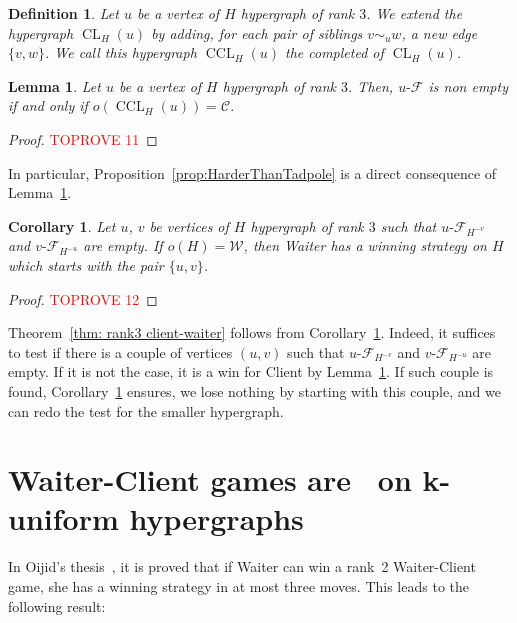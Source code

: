 \documentclass{article}
\newcommand{\hedge}{edge\xspace}
\DeclareMathOperator{\CL}{CL}
\DeclareMathOperator{\CCL}{CCL}
\newcommand{\Client}{\mathcal{C}}
\newcommand{\Waiter}{\mathcal{W}}
\newcommand{\uCwin}{u\text{-}\mathcal{F}}
\newcommand{\vCwin}{v\text{-}\mathcal{F}}
\newtheorem{lemma}[theorem]{Lemma}
\newtheorem{corollary}[theorem]{Corollary}
\newtheorem{definition}[theorem]{Definition}
\begin{document}
\begin{definition}
	Let  \(u\) be a vertex of \(H\) hypergraph of rank \(3\). 
	We extend the hypergraph \(\CL_H(u)\) by adding, for each pair of siblings \(v \sim_u w\), a new \hedge \(\{v,w\}\). We call this hypergraph \(\CCL_H(u)\) the {\em completed} of \(\CL_H(u)\). 
\end{definition}

\begin{lemma}\label{lem:CC_iff_Tadpole}
	Let \(u\) be a vertex of \(H\) hypergraph of rank \(3\). Then, \(\uCwin\) is non empty if and only if \(o(\CCL_{H}(u)) = \Client\).
\end{lemma}

\begin{proof}\textcolor{red}{TOPROVE 11}\end{proof}

In particular, Proposition~\ref{prop:HarderThanTadpole} is a direct consequence of Lemma~\ref{lem:CC_iff_Tadpole}.

\begin{corollary}\label{cor:CC_iff_coupleTadpoles}
	Let \(u\), \(v\) be vertices of \(H\) hypergraph of rank \(3\) such that \(\uCwin_{H^{-v}}\) and \(\vCwin_{H^{-u}}\) are empty. If \(o(H)= \Waiter\), then Waiter has a winning strategy on \(H\) which starts with the pair \(\{u,v\}\). 
\end{corollary}



\begin{proof}\textcolor{red}{TOPROVE 12}\end{proof}

Theorem~\ref{thm: rank3 client-waiter} follows from Corollary~\ref{cor:CC_iff_coupleTadpoles}. Indeed, it suffices to test if there is a couple of vertices \((u,v)\) such that \(\uCwin_{H^{-v}}\) and \(\vCwin_{H^{-u}}\) are empty. If it is not the case, it is a win for Client by Lemma~\ref{lem:CC_iff_Tadpole}. If such couple is found, Corollary~\ref{cor:CC_iff_coupleTadpoles} ensures, we lose nothing by starting with this couple, and we can redo the test for the smaller hypergraph.



\section{Waiter-Client games are \FPT\ on k-uniform hypergraphs} \label{sec: waiter-client}



In Oijid's thesis~\cite{oij2024thesis}, it is proved that if Waiter can win a rank~2 Waiter-Client game, she has a winning strategy in at most three moves. This leads to the following result:
\end{document}

